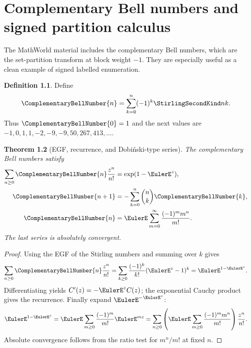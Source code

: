 \documentclass[11pt,a4paper,oneside,openany]{book}
\newtheorem{theorem}{Theorem}[chapter]
\theoremstyle{definition}
\newtheorem{definition}[theorem]{Definition}
\theoremstyle{remark}
\begin{document}
\chapter{Complementary Bell numbers and signed partition calculus}
\label{ch:merged-complementary-bell}

The MathWorld material includes the complementary Bell numbers, which are the
set-partition transform at block weight $-1$.  They are especially useful as a
clean example of signed labelled enumeration.

\begin{definition}
Define
\begin{equation}
 \ComplementaryBellNumber{n}=\sum_{k=0}^{n}(-1)^k\StirlingSecondKind nk.               \label{eq:merged-complementary-bell}
\end{equation}
Thus
$\ComplementaryBellNumber{0}=1$ and the next values are
$-1,0,1,1,-2,-9,-9,50,267,413,\ldots$.
\end{definition}

\begin{theorem}[EGF, recurrence, and Dobiński-type series]
\label{thm:merged-complementary-bell}
The complementary Bell numbers satisfy
\begin{align}
 \sum_{n\geq0}\ComplementaryBellNumber{n}\frac{z^n}{n!}
   &=\exp(1-\EulerE^z),                                                    \label{eq:merged-complementary-egf}\\
 \ComplementaryBellNumber{n+1}
   &=-\sum_{k=0}^{n}\binom nk\ComplementaryBellNumber{k},                  \label{eq:merged-complementary-recurrence}\\
 \ComplementaryBellNumber{n}
   &=\EulerE\sum_{m=0}^{\infty}\frac{(-1)^m m^n}{m!}.                    \label{eq:merged-complementary-dobinski}
\end{align}
The last series is absolutely convergent.
\end{theorem}

\begin{proof}
Using the EGF of the Stirling numbers and summing over $k$ gives
\[
 \sum_{n\geq0}\ComplementaryBellNumber{n}\frac{z^n}{n!}
 =\sum_{k\geq0}\frac{(-1)^k}{k!}(\EulerE^z-1)^k=\EulerE^{1-\EulerE^z}.
\]
Differentiating yields $C'(z)=-\EulerE^zC(z)$; the exponential Cauchy product gives
the recurrence.  Finally expand $\EulerE^{-\EulerE^z}$:
\[
 \EulerE^{1-\EulerE^z}=\EulerE\sum_{m\geq0}\frac{(-1)^m}{m!}\EulerE^{mz}
 =\sum_{n\geq0}\left(\EulerE\sum_{m\geq0}\frac{(-1)^mm^n}{m!}\right)
                  \frac{z^n}{n!}.
\]
Absolute convergence follows from the ratio test for $m^n/m!$ at fixed $n$.
\end{proof}
\end{document}
